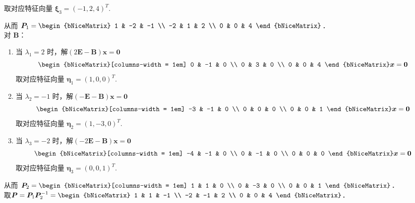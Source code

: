 \documentclass[12pt, a4paper, oneside, UTF8]{ctexbook}
\begin{document}
\begin{solution}
\begin{enumerate}
\[    \]
    取对应特征向量 $\bm{\xi}_3=(-1, 2, 4)^T$.
\end{enumerate}
从而 $\bm{P}_1 = \begin{bNiceMatrix} 1 & -2 & -1 \\ -2 & 1 & 2 \\ 0 & 0 & 4 \end{bNiceMatrix}$．\\
对 $\bm{B}$：
\begin{enumerate}
    \item 当 $\lambda_1=2$ 时，解$(2\bm{E}-\bm{B})\bm{x}=\bm{0} $
    \[ \begin{bNiceMatrix}[columns-width = 1em] 0 & -1 & 0 \\ 0 & 3 & 0 \\ 0 & 0 & 4 \end{bNiceMatrix} \bm{x}=\bm{0}\]
     取对应特征向量 $\bm{\eta}_1=(1, 0, 0)^T$.
    \item 当 $\lambda_2=-1$ 时，解$(-\bm{E}-\bm{B})\bm{x}=\bm{0} $\[ \begin{bNiceMatrix}[columns-width = 1em] -3 & -1 & 0 \\ 0 & 0 & 0 \\ 0 & 0 & 1 \end{bNiceMatrix} \bm{x}=\bm{0}\] 
    取对应特征向量 $\bm{\eta}_2=(1, -3, 0)^T$.
    \item  当 $\lambda_3=-2$ 时，解$(-2\bm{E}-\bm{B})\bm{x}=\bm{0}$ \[\begin{bNiceMatrix}[columns-width = 1em] -4 & -1 & 0 \\ 0 & -1 & 0 \\ 0 & 0 & 0 \end{bNiceMatrix} \bm{x}=\bm{0}\] 
    取对应特征向量 $\bm{\eta}_3=(0, 0, 1)^T$.
\end{enumerate}
从而 $\bm{P}_2 = \begin{bNiceMatrix}[columns-width = 1em] 1 & 1 & 0 \\ 0 & -3 & 0 \\ 0 & 0 & 1 \end{bNiceMatrix}$．\\[1em]
取$\bm{P} = \bm{P}_1 \bm{P}_2^{-1} = \begin{bNiceMatrix} 1 & 1 & -1 \\ -2 & -1 & 2 \\ 0 & 0 & 4 \end{bNiceMatrix}$．
\end{solution}


\ifx\allfiles\undefined
\end{document}
